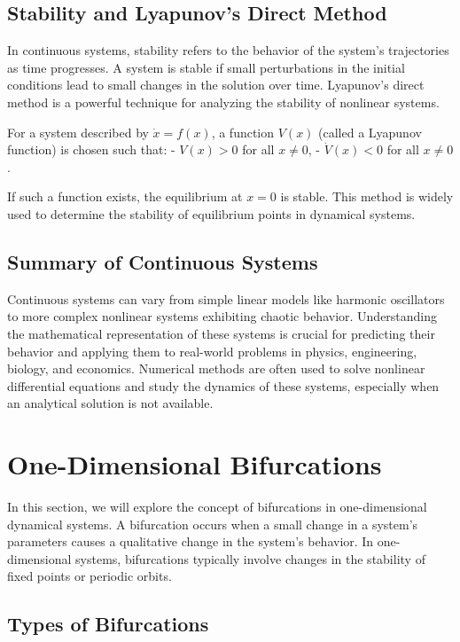 \documentclass{amsbook}
\begin{document}
\subsection{Stability and Lyapunov's Direct Method}

In continuous systems, stability refers to the behavior of the system's trajectories as time progresses. A system is stable if small perturbations in the initial conditions lead to small changes in the solution over time. Lyapunov's direct method is a powerful technique for analyzing the stability of nonlinear systems. 

For a system described by \(\dot{x} = f(x)\), a function \(V(x)\) (called a Lyapunov function) is chosen such that:
- \(V(x) > 0\) for all \(x \neq 0\),
- \(\dot{V}(x) < 0\) for all \(x \neq 0\).

If such a function exists, the equilibrium at \(x = 0\) is stable. This method is widely used to determine the stability of equilibrium points in dynamical systems.

\subsection{Summary of Continuous Systems}

Continuous systems can vary from simple linear models like harmonic oscillators to more complex nonlinear systems exhibiting chaotic behavior. Understanding the mathematical representation of these systems is crucial for predicting their behavior and applying them to real-world problems in physics, engineering, biology, and economics. Numerical methods are often used to solve nonlinear differential equations and study the dynamics of these systems, especially when an analytical solution is not available.

\section{One-Dimensional Bifurcations}

In this section, we will explore the concept of bifurcations in one-dimensional dynamical systems. A bifurcation occurs when a small change in a system's parameters causes a qualitative change in the system's behavior. In one-dimensional systems, bifurcations typically involve changes in the stability of fixed points or periodic orbits.

\subsection{Types of Bifurcations}
\end{document}
